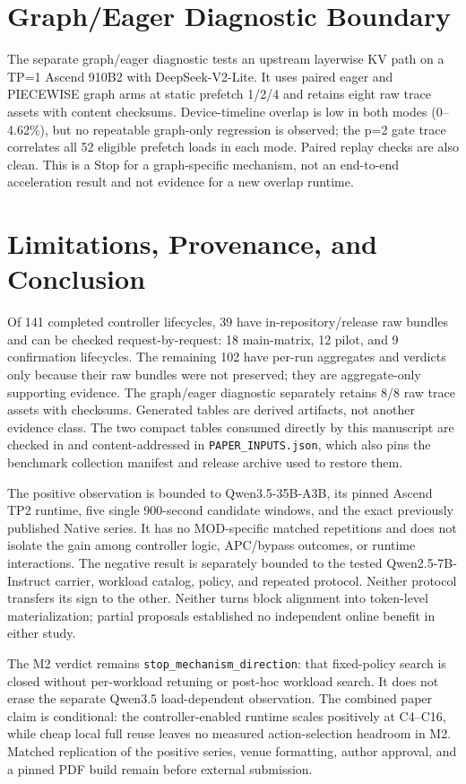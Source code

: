 \documentclass[conference]{IEEEtran}
\begin{document}
\section{Graph/Eager Diagnostic Boundary}
The separate graph/eager diagnostic tests an upstream layerwise KV path on a
TP=1 Ascend 910B2 with DeepSeek-V2-Lite. It uses paired eager and PIECEWISE
graph arms at static prefetch 1/2/4 and retains eight raw trace assets with
content checksums. Device-timeline overlap is low in both modes (0--4.62\%),
but no repeatable graph-only regression is observed; the p=2 gate trace
correlates all 52 eligible prefetch loads in each mode. Paired replay checks
are also clean. This is a Stop for a graph-specific mechanism, not an
end-to-end acceleration result and not evidence for a new overlap runtime.

\section{Limitations, Provenance, and Conclusion}
Of 141 completed controller lifecycles, 39 have in-repository/release raw bundles and
can be checked request-by-request: 18 main-matrix, 12 pilot, and 9 confirmation
lifecycles. The remaining 102 have per-run aggregates and verdicts only because
their raw bundles were not preserved; they are aggregate-only supporting
evidence. The graph/eager diagnostic separately retains 8/8 raw trace assets with checksums.
Generated tables are derived artifacts, not another evidence class.
The two compact tables consumed directly by this manuscript are checked in and
content-addressed in \texttt{PAPER\_INPUTS.json}, which also pins the benchmark
collection manifest and release archive used to restore them.

The positive observation is bounded to Qwen3.5-35B-A3B, its pinned Ascend TP2
runtime, five single 900-second candidate windows, and the exact previously
published Native series. It has no MOD-specific matched repetitions and does
not isolate the gain among controller logic, APC/bypass outcomes, or runtime
interactions. The negative result is separately bounded to the tested
Qwen2.5-7B-Instruct carrier, workload catalog, policy, and repeated protocol.
Neither protocol transfers its sign to the other. Neither turns block alignment
into token-level materialization; partial proposals established no independent
online benefit in either study.

The M2 verdict remains \texttt{stop\_mechanism\_direction}: that fixed-policy
search is closed without per-workload retuning or post-hoc workload search. It
does not erase the separate Qwen3.5 load-dependent observation. The combined
paper claim is conditional: the controller-enabled runtime scales positively
at C4--C16, while cheap local full reuse leaves no measured action-selection
headroom in M2. Matched replication of the positive series, venue formatting,
author approval, and a pinned PDF build remain before external submission.


\end{document}
